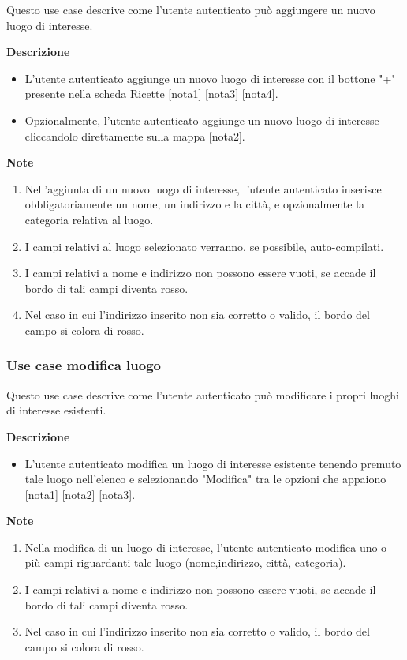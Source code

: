 \documentclass[a4paper,12pt]{article}
\begin{document}
Questo use case descrive come l'utente autenticato può aggiungere un nuovo luogo di interesse.

\textbf{Descrizione}
\begin{itemize} \setlength\itemsep{0.01em}
\item L'utente autenticato aggiunge un nuovo luogo di interesse con il bottone "+" presente nella scheda Ricette [nota1] [nota3] [nota4].
\item Opzionalmente, l'utente autenticato aggiunge un nuovo luogo di interesse cliccandolo direttamente sulla mappa [nota2].
\end{itemize}

\textbf{Note}
\begin{enumerate} \setlength\itemsep{0.01em}
\item Nell'aggiunta di un nuovo luogo di interesse, l'utente autenticato inserisce obbligatoriamente un nome, un indirizzo e la città, e opzionalmente la categoria relativa al luogo.
\item I campi relativi al luogo selezionato verranno, se possibile, auto-compilati.
\item I campi relativi a nome e indirizzo non possono essere vuoti, se accade il bordo di tali campi diventa rosso.
\item Nel caso in cui l'indirizzo inserito non sia corretto o valido, il bordo del campo si colora di rosso.
\end{enumerate}



\subsubsection*{Use case modifica luogo}

Questo use case descrive come l'utente autenticato può modificare i propri luoghi di interesse esistenti.

\textbf{Descrizione}
\begin{itemize} \setlength\itemsep{0.01em}
\item L'utente autenticato modifica un luogo di interesse esistente tenendo premuto tale luogo nell'elenco e selezionando "Modifica" tra le opzioni che appaiono [nota1] [nota2] [nota3].
\end{itemize}

\textbf{Note}
\begin{enumerate} \setlength\itemsep{0.01em}
\item Nella modifica di un luogo di interesse, l'utente autenticato modifica uno o più campi riguardanti tale luogo (nome,indirizzo, città, categoria).
\item I campi relativi a nome e indirizzo non possono essere vuoti, se accade il bordo di tali campi diventa rosso.
\item Nel caso in cui l'indirizzo inserito non sia corretto o valido, il bordo del campo si colora di rosso.
\end{enumerate}
\end{document}
